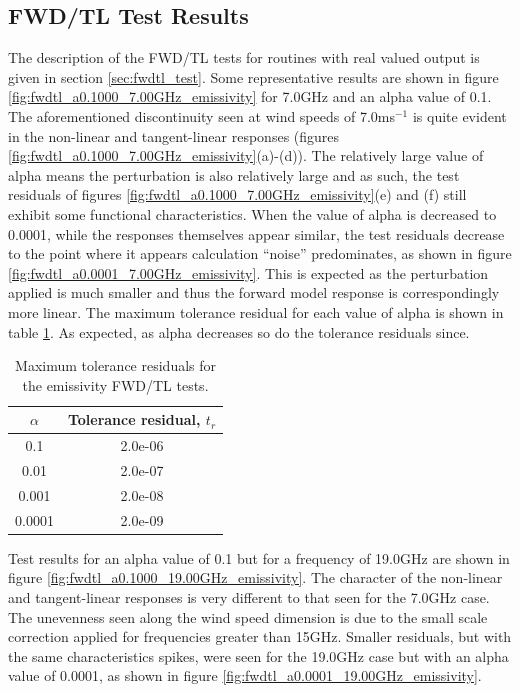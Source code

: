 \subsection{FWD/TL Test Results}
The description of the FWD/TL tests for routines with real valued output is given in section \ref{sec:fwdtl_test}. Some representative results are shown in figure \ref{fig:fwdtl_a0.1000_7.00GHz_emissivity} for 7.0GHz and an alpha value of 0.1. The aforementioned discontinuity seen at wind speeds of 7.0ms$^{-1}$ is quite evident in the non-linear and tangent-linear responses (figures \ref{fig:fwdtl_a0.1000_7.00GHz_emissivity}(a)-(d)). The relatively large value of alpha means the perturbation is also relatively large and as such, the test residuals of figures \ref{fig:fwdtl_a0.1000_7.00GHz_emissivity}(e) and (f) still exhibit some functional characteristics. When the value of alpha is decreased to 0.0001, while the responses themselves appear similar, the test residuals decrease to the point where it appears calculation ``noise'' predominates, as shown in figure \ref{fig:fwdtl_a0.0001_7.00GHz_emissivity}. This is expected as the perturbation applied is much smaller and thus the forward model response is correspondingly more linear. The maximum tolerance residual for each value of alpha is shown in table \ref{tab:fwdtl_alpha}. As expected, as alpha decreases so do the tolerance residuals since.
\begin{table}[htp]
  \centering
  \begin{tabular}{| c | c |}
    \hline
    \boldmath$\alpha$\unboldmath & \textbf{Tolerance residual,} \boldmath$t_r$\unboldmath \\
    \hline\hline
    0.1    & 2.0e-06 \\
    0.01   & 2.0e-07 \\
    0.001  & 2.0e-08 \\
    0.0001 & 2.0e-09 \\
    \hline
  \end{tabular}
  \caption{Maximum tolerance residuals for the emissivity FWD/TL tests.}
  \label{tab:fwdtl_alpha}
\end{table}

Test results for an alpha value of 0.1 but for a frequency of 19.0GHz are shown in figure \ref{fig:fwdtl_a0.1000_19.00GHz_emissivity}. The character of the non-linear and tangent-linear responses is very different to that seen for the 7.0GHz case. The unevenness seen along the wind speed dimension is due to the small scale correction applied for frequencies greater than 15GHz. Smaller residuals, but with the same characteristics spikes, were seen for the  19.0GHz case but with an alpha value of 0.0001, as shown in figure \ref{fig:fwdtl_a0.0001_19.00GHz_emissivity}.

